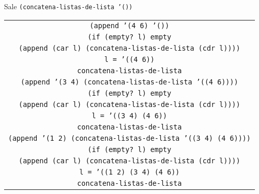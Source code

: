 \documentclass[letterpaper,11pt]{article}
\begin{document}
\begin{enumerate}
\begin{enumerate}
        Sale \texttt{(concatena-listas-de-lista '())}
        \begin{center}
            \begin{tabular}{|c|}
                \hline
                \texttt{(append '(4 6) '())} \\
                \texttt{(if (empty? l) empty} \\
                \texttt{(append (car l) (concatena-listas-de-lista (cdr l))))} \\
                \texttt{l = '((4 6))} \\
                \texttt{concatena-listas-de-lista} \\
                \hline
                \hline
                \texttt{(append '(3 4) 
                (concatena-listas-de-lista '((4 6))))}  \\
                \texttt{(if (empty? l) empty} \\
                \texttt{(append (car l) (concatena-listas-de-lista (cdr l))))} \\
                \texttt{l = '((3 4) (4 6))} \\
                \texttt{concatena-listas-de-lista} \\
                \hline
                \hline
                \texttt{(append '(1 2) 
                (concatena-listas-de-lista '((3 4) (4 6))))}  \\
                \texttt{(if (empty? l) empty} \\
                \texttt{(append (car l) (concatena-listas-de-lista (cdr l))))} \\
                \texttt{l = '((1 2) (3 4) (4 6))} \\
                \texttt{concatena-listas-de-lista} \\
                \hline
            \end{tabular}
        \end{center}
        

\end{enumerate}
\end{enumerate}
\end{document}

